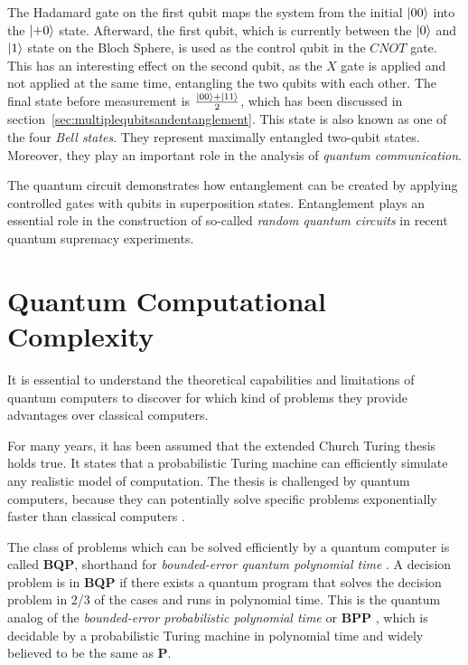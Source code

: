 The Hadamard gate on the first qubit maps the system from the initial $\Ket{00}$
into the $\Ket{+0}$ state. Afterward, the first qubit, which is currently
between the $\Ket{0}$ and $\Ket{1}$ state on the Bloch Sphere, is used as the
control qubit in the $CNOT$ gate. This has an interesting effect on the second qubit,
as the $X$ gate is applied and not applied at the same time, entangling
the two qubits with each other. The final state before measurement is
$\frac{\Ket{00} + \Ket{11}}{2}$, which has been discussed in section~\ref{sec:multiplequbitsandentanglement}.
This state is also known as one of the four \textit{Bell states}. They represent maximally
entangled two-qubit states. Moreover, they play an important role in the analysis of
\textit{quantum communication}.

The quantum circuit demonstrates how entanglement can be created by applying controlled gates with qubits in superposition states.
Entanglement plays an essential role in the construction of so-called \textit{random
quantum circuits} in recent quantum supremacy experiments.


\section{Quantum Computational Complexity}
\label{sec:quantum_computational_complexity}

It is essential to understand the theoretical capabilities and limitations of quantum computers to discover for which kind of problems
they provide advantages over classical computers. 

For many years, it has been assumed that the extended Church Turing thesis holds true. It states that a probabilistic
Turing machine can efficiently simulate any realistic model of computation. The thesis is challenged by quantum computers, because they can potentially solve specific problems exponentially faster than classical computers \cite{feynman1982simulating}.

The class of problems which can be solved efficiently by a quantum
computer is called \textbf{BQP}, shorthand for \textit{bounded-error quantum
  polynomial time} \cite{Bernstein93quantumcomplexity}. A decision problem is in \textbf{BQP} if there exists a quantum
program that solves the decision problem in 2/3 of the cases and runs in
polynomial time. This is the quantum analog of the \textit{bounded-error
  probabilistic polynomial time} or \textbf{BPP} \cite{gill1977computational}, which is decidable by a
probabilistic Turing machine in polynomial time and widely believed to be the same as
\textbf{P}.

